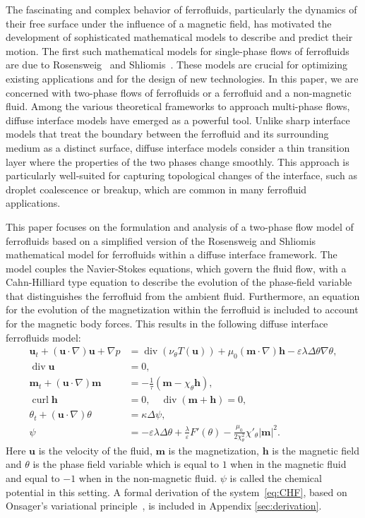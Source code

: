 \documentclass[10pt,letterpaper,twoside]{amsart}
\theoremstyle{definition}{\newtheorem{definition}[lemma]{Definition}}
\theoremstyle{note}{\newtheorem{claim}{Claim}[section]
\newtheorem*{claim*}{Claim}}
\numberwithin{equation}{section}
\newcommand{\eps}{\varepsilon}
\newcommand{\Grad}{\nabla}
\newcommand{\Div}{\operatorname{div}}
\newcommand{\Curl}{\operatorname{curl}}
\newcommand{\bu}{\mathbf{u}}
\newcommand{\bm}{\mathbf{m}}
\newcommand{\bh}{\mathbf{h}}
\begin{document}
 The fascinating and complex behavior of ferrofluids, particularly the dynamics of their free surface under the influence of a magnetic field, has motivated the development of sophisticated mathematical models to describe and predict their motion. The first such mathematical  models for single-phase flows of ferrofluids
 are due to Rosensweig~\cite{Rosensweig1985,Rosensweig1985a,NeuringerRosensweig1964} and Shliomis~\cite{Shliomis2002}.
 These models are crucial for optimizing existing applications and for the design of new technologies. In this paper, we are concerned with two-phase flows of ferrofluids or a ferrofluid and a non-magnetic fluid. Among the various theoretical frameworks to approach multi-phase flows, diffuse interface models have emerged as a powerful tool. Unlike sharp interface models that treat the boundary between the ferrofluid and its surrounding medium as a distinct surface, diffuse interface models consider a thin transition layer where the properties of the two phases change smoothly. This approach is particularly well-suited for capturing topological changes of the interface, such as droplet coalescence or breakup, which are common in many ferrofluid applications.
 
 This paper focuses on the formulation and analysis of a two-phase flow model of ferrofluids based on a simplified version of the Rosensweig and Shliomis mathematical model for ferrofluids  within a diffuse interface framework. The model couples the Navier-Stokes equations, which govern the fluid flow, with a Cahn-Hilliard type equation to describe the evolution of the phase-field variable that distinguishes the ferrofluid from the ambient fluid. Furthermore, an equation for the evolution of the magnetization within the ferrofluid is included to account for the magnetic body forces. 
 This results in the following  diffuse interface ferrofluids model:
\begin{subequations}\label{eq:CHF}
\begin{align}
    \bu_t+(\bu\cdot\Grad)\bu+\Grad p&=\Div(\nu_\theta T(\bu))+\mu_0(\bm\cdot\Grad)\bh-\eps\lambda\Delta\theta\Grad\theta,\label{eq:nse1}\\
    \Div\bu&=0,\\
    \bm_t+(\bu\cdot\Grad)\bm&=-\frac{1}{\tau}(\bm-\chi_\theta\bh),\label{eq:eqm}\\
    \Curl\bh &=0,\quad \Div(\bm+\bh)=0,\label{eq:maxwell1}\\
    \theta_t+(\bu\cdot\Grad)\theta&=\kappa\Delta\psi,\label{eq:phasefield1}\\
    \psi&= -\eps\lambda\Delta\theta+\frac{\lambda}{\eps}F'(\theta)-\frac{\mu_0}{2\chi_\theta^2}\chi'_\theta|\bm|^2.\label{eq:psi}
\end{align}
\end{subequations}
Here $\bu$ is the velocity of the fluid, $\bm$ is the magnetization, $\bh$ is the magnetic field and $\theta$ is the phase field variable which is equal to $1$ when in the magnetic fluid and equal to $-1$ when in the non-magnetic fluid. $\psi$ is called the chemical potential in this setting. A formal derivation of the system~\eqref{eq:CHF}, based on Onsager's variational principle~\cite{Onsager1931,Onsager1931b}, is included in Appendix \ref{sec:derivation}. 
\end{document}
